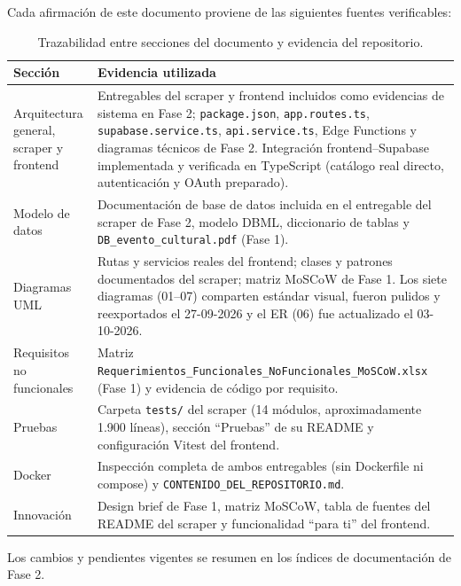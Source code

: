 \documentclass[11pt,a4paper]{article}
\begin{document}
Cada afirmación de este documento proviene de las siguientes fuentes verificables:

\begin{table}[h]
\centering\small
\renewcommand{\arraystretch}{1.25}
\begin{tabular}{p{5.2cm} p{8.6cm}}
\toprule
\textbf{Sección} & \textbf{Evidencia utilizada} \\
\midrule
Arquitectura general, scraper y frontend &
Entregables del scraper y frontend incluidos como evidencias de sistema en Fase 2;
\texttt{package.json}, \texttt{app.routes.ts}, \texttt{supabase.service.ts},
\texttt{api.service.ts}, Edge Functions y diagramas técnicos de Fase 2.
Integración frontend--Supabase implementada y verificada en TypeScript
(catálogo real directo, autenticación y OAuth preparado). \\
Modelo de datos &
Documentación de base de datos incluida en el entregable del scraper de Fase 2,
modelo DBML, diccionario de tablas y
\texttt{DB\_evento\_cultural.pdf} (Fase 1). \\
Diagramas UML &
Rutas y servicios reales del frontend; clases y patrones documentados del scraper;
matriz MoSCoW de Fase 1. Los siete diagramas (01--07) comparten estándar visual,
fueron pulidos y reexportados el 27-09-2026 y el ER (06) fue actualizado el 03-10-2026. \\
Requisitos no funcionales &
Matriz \texttt{Requerimientos\_Funcionales\_NoFuncionales\_MoSCoW.xlsx} (Fase 1) y
evidencia de código por requisito. \\
Pruebas &
Carpeta \texttt{tests/} del scraper (14 módulos, aproximadamente 1.900 líneas),
sección ``Pruebas'' de su README y configuración Vitest del frontend. \\
Docker &
Inspección completa de ambos entregables (sin Dockerfile ni compose) y
\texttt{CONTENIDO\_DEL\_REPOSITORIO.md}. \\
Innovación &
Design brief de Fase 1, matriz MoSCoW, tabla de fuentes del README del scraper y
funcionalidad ``para ti'' del frontend. \\
\bottomrule
\end{tabular}
\caption{Trazabilidad entre secciones del documento y evidencia del repositorio.}
\label{tab:traza}
\end{table}

Los cambios y pendientes vigentes se resumen en los índices de documentación de Fase 2.
\end{document}
